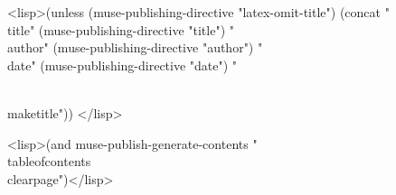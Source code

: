 \documentclass{<lisp>(or (muse-publishing-directive "latex-document-class")
  "article")</lisp>}
\begin{document}
<lisp>(unless (muse-publishing-directive "latex-omit-title")
(concat "\\title{" (muse-publishing-directive "title") "}
\\author{" (muse-publishing-directive "author") "}
\\date{" (muse-publishing-directive "date") "}

\\maketitle"))
</lisp>

<lisp>(and muse-publish-generate-contents
           "\\tableofcontents
\\clearpage")</lisp>
\end{document}
